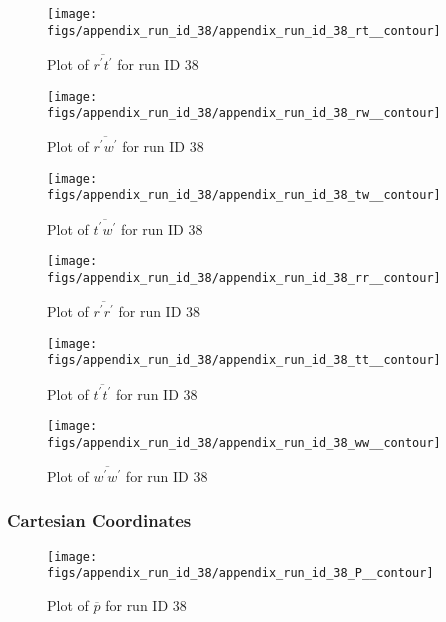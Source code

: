 \begin{figure}[H]
\centering
\texttt{[image: figs/appendix\_run\_id\_38/appendix\_run\_id\_38\_rt\_\_contour]}
\caption{Plot of $\overline{r^\prime t^\prime}$ for run ID 38}
\label{fig:appendix_run_id_38_rt__contour}
\end{figure}


\begin{figure}[H]
\centering
\texttt{[image: figs/appendix\_run\_id\_38/appendix\_run\_id\_38\_rw\_\_contour]}
\caption{Plot of $\overline{r^\prime w^\prime}$ for run ID 38}
\label{fig:appendix_run_id_38_rw__contour}
\end{figure}


\begin{figure}[H]
\centering
\texttt{[image: figs/appendix\_run\_id\_38/appendix\_run\_id\_38\_tw\_\_contour]}
\caption{Plot of $\overline{t^\prime w^\prime}$ for run ID 38}
\label{fig:appendix_run_id_38_tw__contour}
\end{figure}


\begin{figure}[H]
\centering
\texttt{[image: figs/appendix\_run\_id\_38/appendix\_run\_id\_38\_rr\_\_contour]}
\caption{Plot of $\overline{r^\prime r^\prime}$ for run ID 38}
\label{fig:appendix_run_id_38_rr__contour}
\end{figure}


\begin{figure}[H]
\centering
\texttt{[image: figs/appendix\_run\_id\_38/appendix\_run\_id\_38\_tt\_\_contour]}
\caption{Plot of $\overline{t^\prime t^\prime}$ for run ID 38}
\label{fig:appendix_run_id_38_tt__contour}
\end{figure}


\begin{figure}[H]
\centering
\texttt{[image: figs/appendix\_run\_id\_38/appendix\_run\_id\_38\_ww\_\_contour]}
\caption{Plot of $\overline{w^\prime w^\prime}$ for run ID 38}
\label{fig:appendix_run_id_38_ww__contour}
\end{figure}


\subsubsection{Cartesian Coordinates}
\begin{figure}[H]
\centering
\texttt{[image: figs/appendix\_run\_id\_38/appendix\_run\_id\_38\_P\_\_contour]}
\caption{Plot of $\overline{p}$ for run ID 38}
\label{fig:appendix_run_id_38_P__contour}
\end{figure}


